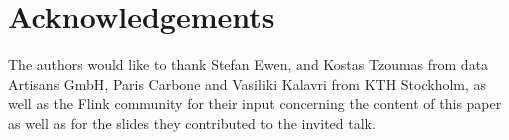 \documentclass{llncs}
\begin{document}
\section{Acknowledgements}
The authors would like to thank Stefan Ewen, and Kostas Tzoumas  from data Artisans GmbH, Paris Carbone and Vasiliki Kalavri from KTH Stockholm, as well as the Flink community for their input concerning the content of this paper as well as for the slides they contributed to the invited talk.



\end{document}
